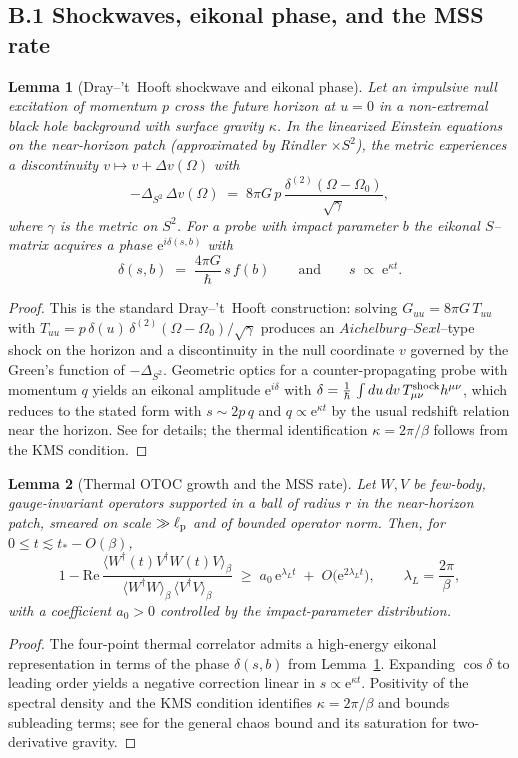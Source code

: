 \documentclass[a4paper,11pt]{article}
\theoremstyle{plain}
\newtheorem{lemma}{Lemma}
\theoremstyle{definition}
\theoremstyle{remark}
\begin{document}
\subsection*{B.1 Shockwaves, eikonal phase, and the MSS rate}
\begin{lemma}[Dray--'t~Hooft shockwave and eikonal phase]
\label{lem:shockwave}
Let an impulsive null excitation of momentum $p$ cross the future horizon at $u{=}0$ in a non-extremal black hole background with surface gravity $\kappa$.
In the linearized Einstein equations on the near-horizon patch (approximated by Rindler $\times S^2$), the metric experiences a discontinuity $v\mapsto v+\Delta v(\Omega)$ with
\[
-\Delta_{S^2}\,\Delta v(\Omega)\;=\;8\pi G\,p\,\frac{\delta^{(2)}(\Omega-\Omega_0)}{\sqrt{\gamma}}\!,
\]
where $\gamma$ is the metric on $S^2$.
For a probe with impact parameter $b$ the eikonal $S$--matrix acquires a phase $\mathrm{e}^{i\delta(s,b)}$ with
\[
\delta(s,b) \;=\; \frac{4\pi G}{\hbar}\,s\,f(b)
\qquad\text{and}\qquad s \;\propto\; \mathrm{e}^{\kappa t}.
\]
\end{lemma}
\begin{proof}
This is the standard Dray--'t~Hooft construction: solving $G_{uu}=8\pi G\,T_{uu}$ with $T_{uu}=p\,\delta(u)\,\delta^{(2)}(\Omega-\Omega_0)/\sqrt{\gamma}$ produces an $Aichelburg$--$Sexl$--type shock on the horizon and a discontinuity in the null coordinate $v$ governed by the Green's function of $-\Delta_{S^2}$.
Geometric optics for a counter-propagating probe with momentum $q$ yields an eikonal amplitude $\mathrm{e}^{i \delta}$ with $\delta=\frac{1}{\hbar}\,\int du\,dv\, T^{\rm shock}_{\mu\nu}h^{\mu\nu}$, which reduces to the stated form with $s\sim 2p\,q$ and $q\propto \mathrm{e}^{\kappa t}$ by the usual redshift relation near the horizon. See \citep{tHooft:1985} for details; the thermal identification $\kappa=2\pi/\beta$ follows from the KMS condition.
\end{proof}

\begin{lemma}[Thermal OTOC growth and the MSS rate]
\label{lem:otoc-growth}
Let $W,V$ be few-body, gauge-invariant operators supported in a ball of radius $r$ in the near-horizon patch, smeared on scale $\gg \ell_{\rm p}$ and of bounded operator norm.
Then, for $0\le t \lesssim t_\ast-O(\beta)$,
\[
1-\mathrm{Re}\,\frac{\langle W^\dagger(t)V^\dagger W(t)V\rangle_\beta}{\langle W^\dagger W\rangle_\beta\,\langle V^\dagger V\rangle_\beta}
\;\ge\; a_0\,\mathrm{e}^{\lambda_L t}\;+\;O\!\big(\mathrm{e}^{2\lambda_L t}\big),
\qquad \lambda_L=\frac{2\pi}{\beta},
\]
with a coefficient $a_0>0$ controlled by the impact-parameter distribution.
\end{lemma}
\begin{proof}
The four-point thermal correlator admits a high-energy eikonal representation in terms of the phase $\delta(s,b)$ from Lemma~\ref{lem:shockwave}.
Expanding $\cos\delta$ to leading order yields a negative correction linear in $s\propto \mathrm{e}^{\kappa t}$.
Positivity of the spectral density and the KMS condition identifies $\kappa=2\pi/\beta$ and bounds subleading terms; see \citep{Maldacena:2016} for the general chaos bound and its saturation for two-derivative gravity.
\end{proof}
\end{document}
